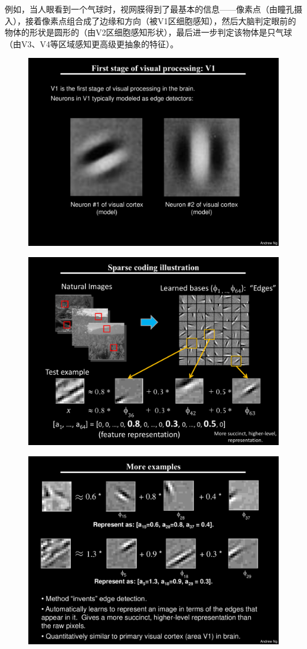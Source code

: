 例如，当人眼看到一个气球时，视网膜得到了最基本的信息——像素点（由瞳孔摄入），接着像素点组合成了边缘和方向（被V1区细胞感知），然后大脑判定眼前的物体的形状是圆形的（由V2区细胞感知形状），最后进一步判定该物体是只气球（由V3、V4等区域感知更高级更抽象的特征）。

\begin{figure}[H]
\centering
\includegraphics[width=12cm]{fig/ref1.pdf}
\end{figure}
\begin{figure}[H]
\centering
\includegraphics[width=12cm]{fig/ref2.pdf}
\end{figure}
\begin{figure}[H]
\centering
\includegraphics[width=12cm]{fig/ref3.pdf}
\end{figure}

 